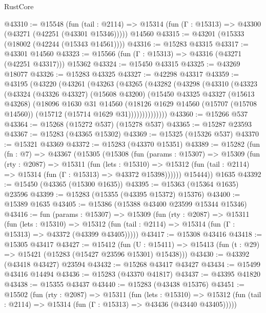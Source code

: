 \begin{lexlean}{RustCore}
\begin{coremodule}
@43310 := @15548
    (fun (tail : @2114) => @15314 (fun (Γ : @15313) => @43300 (@43271 (@42251 (@43301 @15346)))))
    @14560
@43315 := @43201 (@15333 (@18002 (@42244 (@15343 @14561))))
@43316 := @15283 @43315
@43317 := @43301 @14560
@43323 := @15566 (fun (Γ : @15313) => @43316 (@43271 (@42251 @43317))) @15362
@43324 := @15450 @43315
@43325 := @43269 @18077
@43326 := @15283 @43325
@43327 := @42298 @43317
@43359 := @43195
    (@43220
      (@43261
        (@43263
          (@43265
            (@43282
              (@43298
                (@43310
                  (@43323
                    (@43324
                      (@43326 @43327)
                      (@15608 @43200)
                      (@15450
                        @43325
                        @43327
                        (@15613 @43268)
                        (@18096
                          @1630
                          @31
                          @14560
                          (@18126
                            @1629
                            @14560
                            (@15707 (@15708 @14560))
                            (@15712 (@15714 @1629 @31))))))))))))))
@43360 := @15266 @537
@43364 := @15268 (@15272 @537) (@15278 @537)
@43365 := @15287 @23593
@43367 := @15283 (@43365 @15302)
@43369 := @15325 (@15326 @537)
@43370 := @15321 @43369
@43372 := @15283 (@43370 @15351)
@43389 := @15282
    (fun (fn : @7) =>
    @43367
      (@15305
        (@15308
          (fun (params : @15307) =>
          @15309
            (fun (rty : @2087) =>
            @15311
              (fun (lets : @15310) =>
              @15312 (fun (tail : @2114) => @15314 (fun (Γ : @15313) => @43372 @15398))))))
        @15444))
    @1635
@43392 := @15450 (@43365 (@15300 @1635))
@43395 := @15363 (@15364 @1635) @23596
@43399 := @15283 (@15355 (@43395 @15372) @15376)
@43400 := @15389 @1635
@43405 := @15386 (@15388 @43400 @23599 @15344 @15346)
@43416 := fun (params : @15307) =>
  @15309
    (fun (rty : @2087) =>
    @15311
      (fun (lets : @15310) =>
      @15312 (fun (tail : @2114) => @15314 (fun (Γ : @15313) => @43372 (@43399 @43405)))))
@43417 := @15308 @43416
@43418 := @15305 @43417
@43427 := @15412
    (fun (U : @15411) => @15413 (fun (t : @29) => @15421 (@15283 (@15427 @23596 @15301) @15438)))
@43430 := @43392 (@43418 @43427) @23594
@43432 := @15268 @43417 @43427
@43434 := @15499 @43416 @14494
@43436 := @15283 (@43370 @41817)
@43437 := @43395 @41820
@43438 := @15355 @43437
@43440 := @15283 (@43438 @15376)
@43451 := @15502
    (fun (rty : @2087) =>
    @15311
      (fun (lets : @15310) =>
      @15312 (fun (tail : @2114) => @15314 (fun (Γ : @15313) => @43436 (@43440 @43405)))))

\end{coremodule}
\end{lexlean}
